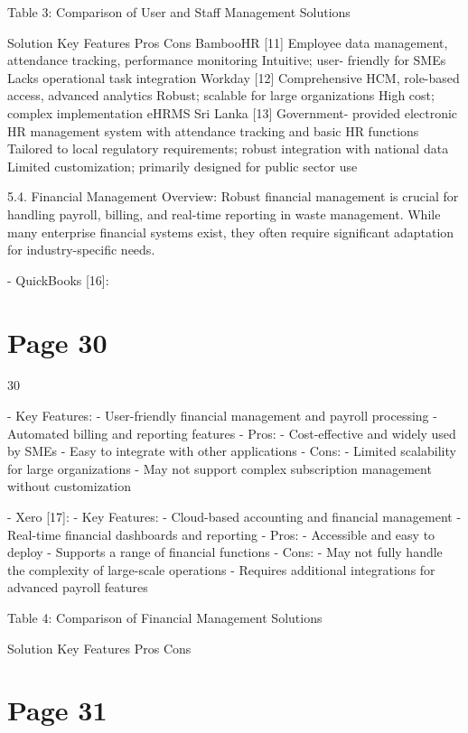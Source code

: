 \documentclass{article}
\begin{document}
Table 3: Comparison of User and Staff Management Solutions 
 
Solution Key Features Pros Cons 
BambooHR [11] Employee data 
management, 
attendance tracking, 
performance 
monitoring 
Intuitive; user-
friendly for SMEs 
Lacks operational 
task integration 
Workday [12] Comprehensive HCM, 
role-based access, 
advanced analytics 
Robust; scalable for 
large organizations 
High cost; complex 
implementation 
eHRMS Sri Lanka [13] Government-
provided electronic 
HR management 
system with 
attendance tracking 
and basic HR 
functions 
Tailored to local 
regulatory 
requirements; robust 
integration with 
national data 
Limited 
customization; 
primarily designed 
for public sector use 
 
5.4. Financial Management 
Overview:   
Robust financial management is crucial for handling payroll, billing, and real-time reporting in 
waste management. While many enterprise financial systems exist, they often require 
significant adaptation for industry-specific needs. 
 
- QuickBooks [16]:   

\section*{Page 30}
   
 
 30  
 
  - Key Features:   
    - User-friendly financial management and payroll processing   
    - Automated billing and reporting features   
  - Pros:   
    - Cost-effective and widely used by SMEs   
    - Easy to integrate with other applications   
  - Cons:   
    - Limited scalability for large organizations   
    - May not support complex subscription management without customization 
 
- Xero [17]:   
  - Key Features:   
    - Cloud-based accounting and financial management   
    - Real-time financial dashboards and reporting   
  - Pros:   
    - Accessible and easy to deploy   
    - Supports a range of financial functions   
  - Cons:   
    - May not fully handle the complexity of large-scale operations   
    - Requires additional integrations for advanced payroll features 
 
 
Table 4: Comparison of Financial Management Solutions 
 
Solution Key Features Pros Cons 

\section*{Page 31}
   
\end{document}
